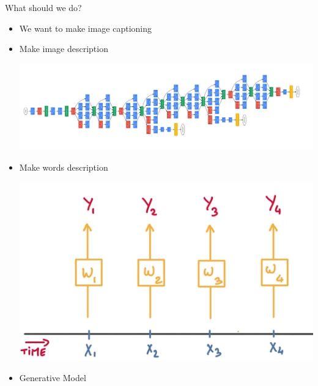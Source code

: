 \documentclass{beamer}
\begin{document}
\begin{frame}{What should we do?}
	\begin{itemize}
		  \item We want to make image captioning
		  \item Make image description
		
			\begin{center}
				  \includegraphics[scale=0.25]{img/gn}
			\end{center}
		
		  \item Make words description 
			\begin{center}
				  \includegraphics[scale=0.15]{img/rec}
			\end{center}
		  \item Generative Model
	\end{itemize}
\end{frame}
\end{document}
